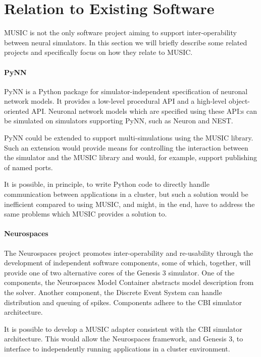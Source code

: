 \documentclass[a4paper,twoside]{report}
\begin{document}
\section{Relation to Existing Software}

MUSIC is not the only software project aiming to support
inter-operability between neural simulators.  In this section we will
briefly describe some related projects and specifically focus on how
they relate to MUSIC.

\paragraph{PyNN}

PyNN is a Python package for simulator-independent specification of
neuronal network models.  It provides a low-level procedural API and a
high-level object-oriented API.  Neuronal network models which are
specified using these API:s can be simulated on simulators supporting
PyNN, such as Neuron and NEST.

PyNN could be extended to support multi-simulations using the MUSIC
library.  Such an extension would provide means for controlling the
interaction between the simulator and the MUSIC library and would, for
example, support publishing of named ports.

It is possible, in principle, to write Python code to directly handle
communication between applications in a cluster, but such a solution
would be inefficient compared to using MUSIC, and might, in the end,
have to address the same problems which MUSIC provides a solution to.

\paragraph{Neurospaces}

The Neurospaces project promotes inter-operability and re-usability
through the development of independent software components, some of
which, together, will provide one of two alternative cores of the
Genesis 3 simulator.  One of the components, the Neurospaces Model
Container abstracts model description from the solver.  Another
component, the Discrete Event System can handle distribution and
queuing of spikes.  Components adhere to the CBI simulator
architecture.

It is possible to develop a MUSIC adapter consistent with the CBI
simulator architecture.  This would allow the Neurospaces framework,
and Genesis 3, to interface to independently running applications in a
cluster environment.
\end{document}
